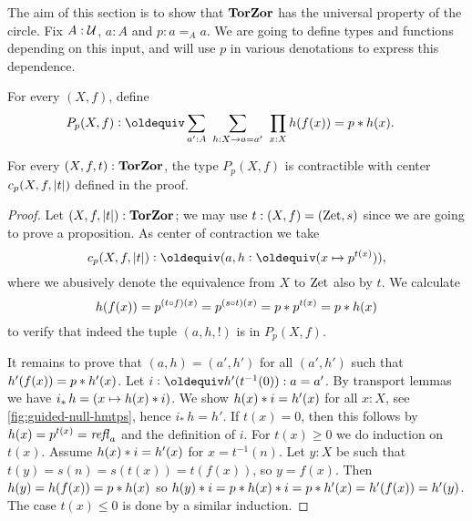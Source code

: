 \documentclass[a4,12pt]{amsart}
\begin{document}
The aim of this section is to show that $\mathbf{TorZor}$ has the
universal property of the circle. Fix $A:\mathcal{U}$, $a:A$ and $p: a=_A a$. 
We are going to define types and
functions depending on this input, and will use $p$ in various
denotations to express this dependence. 

\begin{definition}\label{def:TBN}
For every $(X,f)$, define
\begin{align*}\label{eq:TBD}
P_p(X,f)&\defeq \sum_{a':A}~\sum_{h:X\to a=a'}~\prod_{x:X} h(f(x))=p\ct h(x).
\end{align*}
\end{definition}

\begin{lemma}\label{lem:guided-null-hmtps}
For every $(X,f,t):\mathbf{TorZor}$, the type $P_p(X,f)$ is contractible
with center $c_p(X,f,\lvert t\rvert)$ defined in the proof.
\end{lemma}
\begin{proof}
Let $(X,f,\lvert t\rvert):\mathbf{TorZor}$; we may use $t:(X,f)=(\mathrm{Zet},s)$ since we
are going to prove a proposition. As center of contraction we take
\[
c_p(X,f,\trunc{t})\defeq (a, h\defeq(x\mapsto p^{t(x)})),
\]
where we 
abusively denote the equivalence from $X$ to $\mathrm{Zet}$ also by $t$.
We calculate 
\[
h(f(x))=p^{(t\circ f)(x)}=p^{(s\circ t)(x)}=p* p^{t(x)}=p* h(x)
\]
to verify that indeed the tuple $(a,h,!)$ is in $P_p(X,f)$.

It remains to prove that $(a,h)=(a',h')$ for all $(a',h')$ such that
$h'(f(x))=p* h'(x)$. Let $i\defeq h'(t^{-1}(0)): a=a'$.
By transport lemmas we have $i_*\, h = (x\mapsto h(x)* i)$.
We show $h(x)* i= h'(x)$ for all $x:X$, 
see \cref{fig:guided-null-hmtps}, hence $i_*\, h = h'$.
If $t(x)=0$, then this follows by $h(x)=p^{t(x)}=\mathop{{\it refl}_{a}}$ and the
definition of $i$. For $t(x)\geq 0$ we do induction on $t(x)$. 
Assume $h(x)* i= h'(x)$ for $x=t^{-1}(n)$.
Let $y:X$ be such that $t(y)=s(n)=s(t(x))=t(f(x))$, so $y=f(x)$.
Then $h(y) = h(f(x)) = p * h(x)$ so 
$h(y)* i= p * h(x)* i = p* h'(x) = h'(f(x)) = h'(y)$.
The case $t(x)\leq 0$ is done by a similar induction.
\end{proof}
\end{document}

